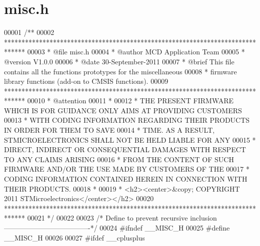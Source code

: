 \section{misc.\+h}
\label{misc_8h_source}

\begin{DoxyCode}
00001 \textcolor{comment}{/**}
00002 \textcolor{comment}{  ******************************************************************************}
00003 \textcolor{comment}{  * @file    misc.h}
00004 \textcolor{comment}{  * @author  MCD Application Team}
00005 \textcolor{comment}{  * @version V1.0.0}
00006 \textcolor{comment}{  * @date    30-September-2011}
00007 \textcolor{comment}{  * @brief   This file contains all the functions prototypes for the miscellaneous}
00008 \textcolor{comment}{  *          firmware library functions (add-on to CMSIS functions).}
00009 \textcolor{comment}{  ******************************************************************************}
00010 \textcolor{comment}{  * @attention}
00011 \textcolor{comment}{  *}
00012 \textcolor{comment}{  * THE PRESENT FIRMWARE WHICH IS FOR GUIDANCE ONLY AIMS AT PROVIDING CUSTOMERS}
00013 \textcolor{comment}{  * WITH CODING INFORMATION REGARDING THEIR PRODUCTS IN ORDER FOR THEM TO SAVE}
00014 \textcolor{comment}{  * TIME. AS A RESULT, STMICROELECTRONICS SHALL NOT BE HELD LIABLE FOR ANY}
00015 \textcolor{comment}{  * DIRECT, INDIRECT OR CONSEQUENTIAL DAMAGES WITH RESPECT TO ANY CLAIMS ARISING}
00016 \textcolor{comment}{  * FROM THE CONTENT OF SUCH FIRMWARE AND/OR THE USE MADE BY CUSTOMERS OF THE}
00017 \textcolor{comment}{  * CODING INFORMATION CONTAINED HEREIN IN CONNECTION WITH THEIR PRODUCTS.}
00018 \textcolor{comment}{  *}
00019 \textcolor{comment}{  * <h2><center>&copy; COPYRIGHT 2011 STMicroelectronics</center></h2>}
00020 \textcolor{comment}{  ******************************************************************************}
00021 \textcolor{comment}{  */}
00022 
00023 \textcolor{comment}{/* Define to prevent recursive inclusion -------------------------------------*/}
00024 \textcolor{preprocessor}{#}\textcolor{preprocessor}{ifndef} \textcolor{preprocessor}{\_\_MISC\_H}
00025 \textcolor{preprocessor}{#}\textcolor{preprocessor}{define} \textcolor{preprocessor}{\_\_MISC\_H}
00026 
00027 \textcolor{preprocessor}{#}\textcolor{preprocessor}{ifdef} \_\_cplusplus

\end{DoxyCode}
